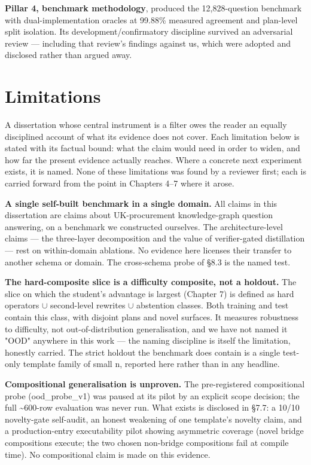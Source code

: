 \documentclass[10pt]{article} %
\begin{document}
\textbf{Pillar 4, benchmark methodology}, produced the 12,828-question benchmark with dual-implementation oracles at 99.88\% measured agreement and plan-level split isolation. Its development/confirmatory discipline survived an adversarial review --- including that review's findings against us, which were adopted and disclosed rather than argued away.

\section{Limitations}\label{sec:limitations}

A dissertation whose central instrument is a filter owes the reader an equally disciplined account of what its evidence does not cover. Each limitation below is stated with its factual bound: what the claim would need in order to widen, and how far the present evidence actually reaches. Where a concrete next experiment exists, it is named. None of these limitations was found by a reviewer first; each is carried forward from the point in Chapters 4--7 where it arose.

\textbf{A single self-built benchmark in a single domain.} All claims in this dissertation are claims about UK-procurement knowledge-graph question answering, on a benchmark we constructed ourselves. The architecture-level claims --- the three-layer decomposition and the value of verifier-gated distillation --- rest on within-domain ablations. No evidence here licenses their transfer to another schema or domain. The cross-schema probe of \S8.3 is the named test.

\textbf{The hard-composite slice is a difficulty composite, not a holdout.} The slice on which the student's advantage is largest (Chapter 7) is defined as hard operators $\cup$ second-level rewrites $\cup$ abstention classes. Both training and test contain this class, with disjoint plans and novel surfaces. It measures robustness to difficulty, not out-of-distribution generalisation, and we have not named it "OOD" anywhere in this work --- the naming discipline is itself the limitation, honestly carried. The strict holdout the benchmark does contain is a single test-only template family of small n, reported here rather than in any headline.

\textbf{Compositional generalisation is unproven.} The pre-registered compositional probe (ood\_probe\_v1) was paused at its pilot by an explicit scope decision; the full \textasciitilde{}600-row evaluation was never run. What exists is disclosed in \S7.7: a 10/10 novelty-gate self-audit, an honest weakening of one template's novelty claim, and a production-entry executability pilot showing asymmetric coverage (novel bridge compositions execute; the two chosen non-bridge compositions fail at compile time). No compositional claim is made on this evidence.
\end{document}
